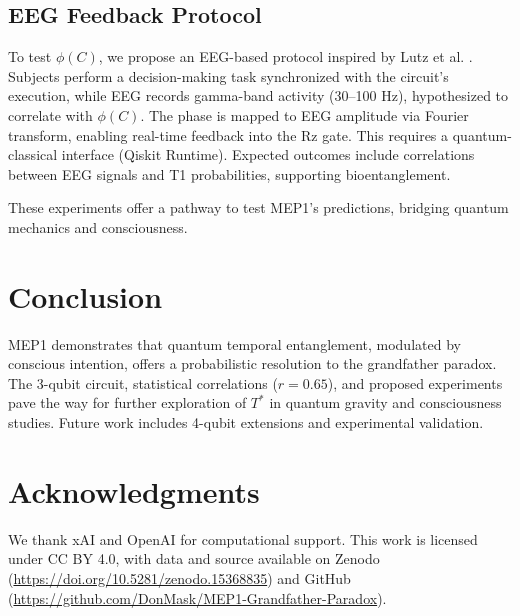 \documentclass[a4paper,12pt]{article}
\begin{document}
\subsection{EEG Feedback Protocol}
To test $\phi(C)$, we propose an EEG-based protocol inspired by Lutz et al. \cite{lutz2004}. Subjects perform a decision-making task synchronized with the circuit’s execution, while EEG records gamma-band activity (30--100 Hz), hypothesized to correlate with $\phi(C)$. The phase is mapped to EEG amplitude via Fourier transform, enabling real-time feedback into the Rz gate. This requires a quantum-classical interface (Qiskit Runtime). Expected outcomes include correlations between EEG signals and T1 probabilities, supporting bioentanglement.

These experiments offer a pathway to test MEP1’s predictions, bridging quantum mechanics and consciousness.

\section{Conclusion}
MEP1 demonstrates that quantum temporal entanglement, modulated by conscious intention, offers a probabilistic resolution to the grandfather paradox. The 3-qubit circuit, statistical correlations ($r = 0.65$), and proposed experiments pave the way for further exploration of $T^*$ in quantum gravity and consciousness studies. Future work includes 4-qubit extensions and experimental validation.

\section{Acknowledgments}
We thank xAI and OpenAI for computational support. This work is licensed under CC BY 4.0, with data and source available on Zenodo (\url{https://doi.org/10.5281/zenodo.15368835}) and GitHub (\url{https://github.com/DonMask/MEP1-Grandfather-Paradox}).
\end{document}
